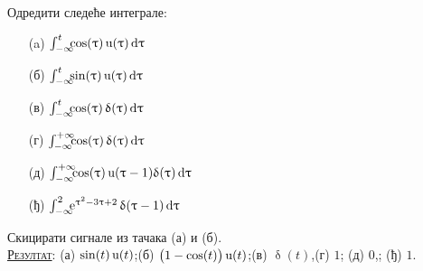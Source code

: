 \noindent
\PID Одредити следеће интеграле: 
\begin{multicols}{3}
\begin{enumerate}
\item[(a)] $\int_{-\infty}^t \hspace*{-0.5em}
\cos (\uptau)\,{\rm u}(\uptau)\,{\rm d}\uptau$
\item[(б)] $\int_{-\infty}^t \hspace*{-0.5em}
\sin (\uptau)\,{\rm u}(\uptau)\,{\rm d}\uptau$
\item[(в)] $\int_{-\infty}^t \hspace*{-0.5em}
\cos (\uptau)\,\updelta(\uptau)\,{\rm d}\uptau$
\item[(г)] $\int_{-\infty}^{+\infty} \hspace*{-0.5em}
\cos (\uptau)\,\updelta(\uptau)\,{\rm d}\uptau$
\item[(д)] $\int_{-\infty}^{+\infty} \hspace*{-0.5em}
\cos (\uptau)\,{\rm u}(\uptau-1)\updelta(\uptau)\,{\rm d}\uptau$
\item[(ђ)] $\int_{-\infty}^{2}
 \hspace*{-0.5em}
{\rm e}^{\uptau^2 - 3\uptau + 2} \, \updelta(\uptau-1) \,{\rm d}\uptau$
\end{enumerate}
\end{multicols}
\noindent
Скицирати сигнале из тачака (а) и (б).
\\[2mm]

\textsc{\underline{Резултат}}:
(а) $\sin(t)\,{\rm u}(t)$;\hfill (б) $\bigl(1 - \cos(t)\bigr)\,{\rm u}(t)$;\hfill (в) $\updelta (t)$,\hfill (г) $1$;\hfill 
(д) $0$,\hfill; (ђ) $1$.
